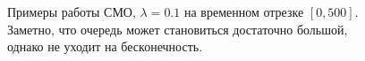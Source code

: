 \documentclass[12pt, a4paper]{article}
\begin{document}
\begin{figure}[H]
\caption{Примеры работы СМО, $\lambda= 0.1$ на временном отрезке $[0,500]$. Заметно, что очередь может становиться достаточно большой, однако не уходит на бесконечность.}
\end{figure}
\end{document}
